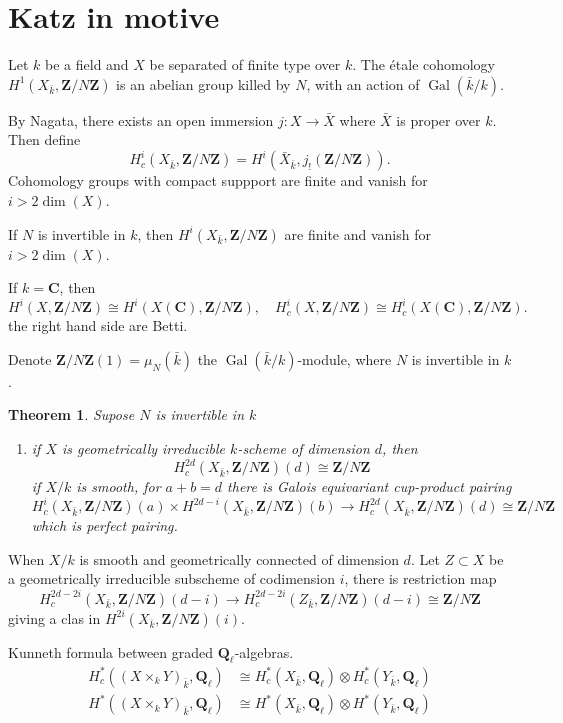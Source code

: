 \documentclass[leqno]{amsart}
\newcommand{\Z}{{\mathbf{Z}}}
\newcommand{\Ql}{\mathbf{Q}_\ell}
\newcommand{\C}{\mathbf C}
\DeclareMathOperator{\Gal}{Gal}
\newcommand{\1}{\mathbf{1}}
\newtheorem{thm}{Theorem}[section]
\theoremstyle{definition}
\theoremstyle{remark}
\begin{document}
\section{Katz in motive}

Let $k$ be a field and
$X$ be separated of finite type over  $k$.
The  \'{e}tale cohomology 
$H^1(X_{\bar{k}}, \Z/N\Z)$ is an abelian group 
killed by $N$, with an action of  $\Gal(\bar{k}/k)$.

By Nagata, there exists an open immersion
$j\colon X\to \bar{X}$
where $ \bar{X}$ is proper over  $k$.
Then define
 \[
	 H^i_c(X_{\bar{k}},\Z/N\Z)=
	 H^i(\bar{X}_{\bar{k}},j_!(\Z/N\Z)).
\]
Cohomology groups with compact suppport
are finite and vanish for $i>2\dim(X)$.

If  $N$ is invertible in  $k$,
then  $H^i(X_{\bar{k}},\Z/N\Z)$
are finite and vanish for $i>2\dim(X)$.

If  $k=\C$, then
 \[
	 H^i(X,\Z/N\Z)\cong H^i(X(\C),\Z/N\Z),\quad
	 H^i_c(X,\Z/N\Z)\cong H^i_c(X(\C),\Z/N\Z).
\]
the right hand side are Betti.

Denote $\Z/N\Z(1)=\mu_N(\bar{k})$
the $\Gal(\bar{k}/k)$-module,
where $N$ is invertible in  $k$.

 \begin{thm}
	Supose $N$ is invertible in  $k$
	 \begin{enumerate}[label=(\alph*)]
		\item if $X$ is geometrically irreducible 
			 $k$-scheme of dimension  $d$,
			 then
			  \[
				  H^{2d}_c(X_{\bar{k}},\Z/N\Z)(d)
				  \cong \Z/N\Z
			 \]
			 if $X/k$ is smooth, for  $a+b=d$
			 there is Galois equivariant 
			 cup-product pairing 
			  \[
				  H^i_c(X_{\bar{k}},\Z/N\Z)(a)
				  \times
				  H^{2d-i}(X_{\bar{k}},\Z/N\Z)(b)
				  \to 
				  H^{2d}_c(X_{\bar{k}},\Z/N\Z)(d)
				  \cong \Z/N\Z
			 \]
			 which is perfect pairing.
	\end{enumerate}
\end{thm}

When $X/k$ is smooth and geometrically connected of dimension  $d$.
Let  $Z\subset X$ be a 
geometrically irreducible subscheme of codimension  $i$,
there is restriction map
 \[
	 H^{2d-2i}_c(X_{\bar{k}},\Z/N\Z)(d-i)\to
	 H^{2d-2i}_c(Z_{\bar{k}},\Z/N\Z)(d-i)\cong \Z/N\Z
\]
giving a clas in $H^{2i}(X_{\bar{k}},\Z/N\Z)(i)$.

Kunneth formula between graded $\Ql$-algebras.
\begin{align*}
	H^*_c((X\times_kY)_{\bar{k}},\Ql)&\cong 
	H^*_c(X_{\bar{k}},\Ql)\otimes H^*_c(Y_{\bar{k}},\Ql)\\
	H^*((X\times_kY)_{\bar{k}},\Ql)&\cong 
	H^*(X_{\bar{k}},\Ql)\otimes H^*(Y_{\bar{k}},\Ql)
\end{align*}
\end{document}
